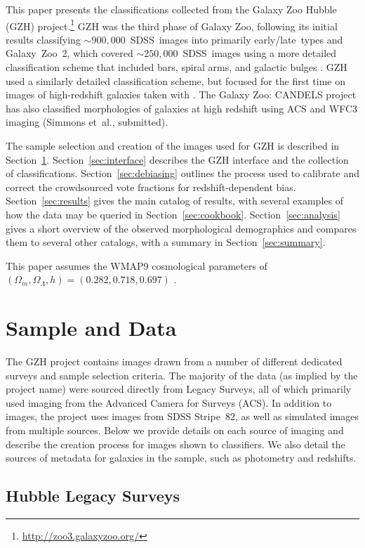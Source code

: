\documentclass[twocolumn]{aastex6}
\begin{document}
This paper presents the classifications collected from the Galaxy Zoo Hubble
(GZH) project.\footnote{\url{http://zoo3.galaxyzoo.org/}} GZH was the third
phase of Galaxy Zoo, following its initial results classifying
$\sim900,000$~SDSS~images into primarily early/late~types \citep{lin11} and
Galaxy~Zoo~2, which covered $\sim250,000$~SDSS~images using a more detailed
classification scheme that included bars, spiral arms, and galactic bulges
\citep{wil13}. GZH used a similarly detailed classification scheme, but focused
for the first time on images of high-redshift galaxies taken with \hst. The
Galaxy Zoo: CANDELS project has also classified morphologies of galaxies at
high redshift using ACS and WFC3 imaging (Simmons et~al., submitted).

The sample selection and creation of the images used for GZH is described in
Section~\ref{sec:data}. Section~\ref{sec:interface} describes the GZH interface
and the collection of classifications. Section~\ref{sec:debiasing} outlines the
process used to calibrate and correct the crowdsourced vote fractions for
redshift-dependent bias. Section~\ref{sec:results} gives the main catalog of
results, with several examples of how the data may be queried in
Section~\ref{sec:cookbook}. Section~\ref{sec:analysis} gives a short overview
of the observed morphological demographics and compares them to several other
catalogs, with a summary in Section~\ref{sec:summary}.

This paper assumes the WMAP9 cosmological parameters of
$(\Omega_m,\Omega_\Lambda,h)=(0.282,0.718,0.697)$ \citep{hin13}.

\section{Sample and Data}\label{sec:data}

The GZH project contains images drawn from a number of different dedicated
surveys and sample selection criteria. The majority of the data (as implied by
the project name) were sourced directly from \hst{} Legacy Surveys, all of which
primarily used imaging from the Advanced Camera for Surveys (ACS). In addition
to \hst{} images, the project uses images from SDSS Stripe~82, as well as
simulated \hst{} images from multiple sources. Below we provide details on each
source of imaging and describe the creation process for images shown to classifiers. 
We also detail the sources of metadata for galaxies in the sample, such as 
photometry and redshifts.

\subsection{Hubble Legacy Surveys}\label{ssec:legacy_surveys}
\end{document}

